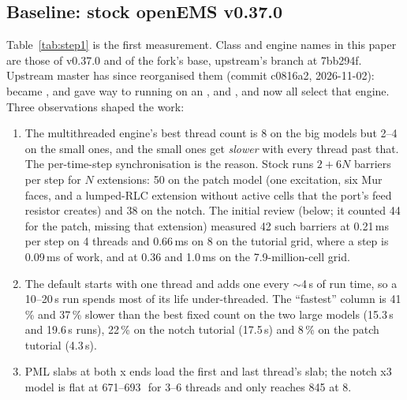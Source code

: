 \subsection{Baseline: stock openEMS v0.37.0}\label{sec:baseline}
Table~\ref{tab:step1} is the first measurement. Class and engine names in this paper are those of v0.37.0 and of the
fork's base, upstream's  branch at 7bb294f. Upstream master has since reorganised them (commit
c0816a2, 2026-11-02):  became ,
 and  gave way to  running on an
, and ,  and  now all select that
engine. Three observations shaped the work:
\begin{enumerate}
\item The multithreaded engine's best thread count is 8 on the big models but 2--4 on the small ones, and the small
  ones get \emph{slower} with every thread past that. The per-time-step synchronisation is the reason. Stock runs
  $2+6N$ barriers per step for $N$ extensions: 50 on the patch model (one excitation, six Mur faces, and a lumped-RLC
  extension without active cells that the port's feed resistor creates) and 38 on the notch. The initial review
  (below; it counted 44 for the patch, missing that extension) measured 42 such barriers at 0.21\,ms per step on 4
  threads and 0.66\,ms on 8 on the tutorial grid, where a step is 0.09\,ms of work, and at 0.36 and 1.0\,ms on the
  7.9-million-cell grid.
\item The default  starts with one thread and adds one every $\sim$4\,s of run time, so a 10--20\,s
  run spends most of its life under-threaded. The ``fastest'' column is 41\,\% and 37\,\% slower than the best fixed
  count on the two large models (15.3\,s and 19.6\,s runs), 22\,\% on the notch tutorial (17.5\,s) and 8\,\% on the
  patch tutorial (4.3\,s).
\item PML slabs at both x ends load the first and last thread's slab; the notch x3 model is flat at 671--693\,\MC\ for
  3--6 threads and only reaches 845 at 8.
\end{enumerate}

